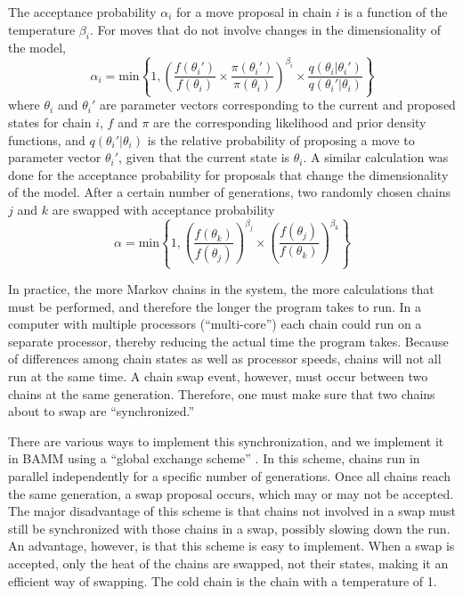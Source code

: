 \documentclass[12pt]{article}
\begin{document}
The acceptance probability $\alpha_i$ for a move proposal in chain $i$
is a function of the temperature $\beta_i$.
%
For moves that do not involve changes in the dimensionality of the model,
\[\alpha_i = \text{min}\left\{ 1,
    \left(
    \frac{f(\theta_i')}{f(\theta_i)} \times
    \frac{\pi(\theta_i')}{\pi(\theta_i)}
    \right)^{\beta_i} \times
    \frac{q(\theta_i | \theta_i')}{q(\theta_i' | \theta_i)}
\right\}\]
where $\theta_i$ and $\theta_i'$ are parameter vectors
corresponding to the current and proposed states for chain $i$,
$f$ and $\pi$ are the corresponding likelihood and prior density functions,
and $q(\theta_i' | \theta_i)$ is the relative probability
of proposing a move to parameter vector $\theta_i'$,
given that the current state is $\theta_i$.
%
A similar calculation was done for the acceptance probability for proposals
that change the dimensionality of the model.
%
After a certain number of generations, two randomly chosen chains $j$ and $k$
are swapped with acceptance probability
\[\alpha = \text{min}\left\{ 1,
    \left(\frac{f(\theta_k)}{f(\theta_j)}\right)^{\beta_j} \times
    \left(\frac{f(\theta_j)}{f(\theta_k)}\right)^{\beta_k}
\right\}\]


In practice, the more Markov chains in the system,
the more calculations that must be performed,
and therefore the longer the program takes to run.
%
In a computer with multiple processors (``multi-core'')
each chain could run on a separate processor,
thereby reducing the actual time the program takes.
%
Because of differences among chain states as well as processor speeds,
chains will not all run at the same time.
%
A chain swap event, however, must occur between two chains
at the same generation.
%
Therefore, one must make sure that two chains about to swap
are ``synchronized.''


There are various ways to implement this synchronization,
and we implement it in BAMM using a ``global exchange scheme'' \citep{alt04}.
%
In this scheme, chains run in parallel independently
for a specific number of generations.
%
Once all chains reach the same generation, a swap proposal occurs,
which may or may not be accepted.
%
The major disadvantage of this scheme
is that chains not involved in a swap
must still be synchronized with those chains in a swap,
possibly slowing down the run.
%
An advantage, however, is that this scheme is easy to implement.
%
When a swap is accepted, only the heat of the chains are swapped,
not their states, making it an efficient way of swapping.
%
The cold chain is the chain with a temperature of 1.
\end{document}
